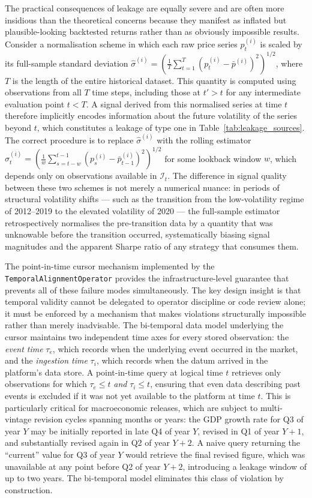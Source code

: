 \documentclass[12pt,openany]{book}
\numberwithin{equation}{chapter}
\theoremstyle{plain}
\theoremstyle{definition}
\theoremstyle{remark}
\begin{document}
The practical consequences of leakage are equally severe and are often more insidious than the theoretical concerns because they manifest as inflated but plausible-looking backtested returns rather than as obviously impossible results. Consider a normalisation scheme in which each raw price series $p_t^{(i)}$ is scaled by its full-sample standard deviation $\hat{\sigma}^{(i)} = \left(\frac{1}{T}\sum_{t=1}^T (p_t^{(i)} - \bar{p}^{(i)})^2\right)^{1/2}$, where $T$ is the length of the entire historical dataset. This quantity is computed using observations from all $T$ time steps, including those at $t' > t$ for any intermediate evaluation point $t < T$. A signal derived from this normalised series at time $t$ therefore implicitly encodes information about the future volatility of the series beyond $t$, which constitutes a leakage of type one in Table~\ref{tab:leakage_sources}. The correct procedure is to replace $\hat{\sigma}^{(i)}$ with the rolling estimator $\hat{\sigma}_t^{(i)} = \left(\frac{1}{w}\sum_{s=t-w}^{t-1} (p_s^{(i)} - \bar{p}_{t-1}^{(i)})^2\right)^{1/2}$ for some lookback window $w$, which depends only on observations available in $\mathcal{I}_t$. The difference in signal quality between these two schemes is not merely a numerical nuance: in periods of structural volatility shifts — such as the transition from the low-volatility regime of 2012–2019 to the elevated volatility of 2020 — the full-sample estimator retrospectively normalises the pre-transition data by a quantity that was unknowable before the transition occurred, systematically biasing signal magnitudes and the apparent Sharpe ratio of any strategy that consumes them.

The point-in-time cursor mechanism implemented by the \texttt{TemporalAlignmentOperator} provides the infrastructure-level guarantee that prevents all of these failure modes simultaneously. The key design insight is that temporal validity cannot be delegated to operator discipline or code review alone; it must be enforced by a mechanism that makes violations structurally impossible rather than merely inadvisable. The bi-temporal data model underlying the cursor maintains two independent time axes for every stored observation: the \emph{event time} $\tau_e$, which records when the underlying event occurred in the market, and the \emph{ingestion time} $\tau_i$, which records when the datum arrived in the platform's data store. A point-in-time query at logical time $t$ retrieves only observations for which $\tau_e \leq t$ \emph{and} $\tau_i \leq t$, ensuring that even data describing past events is excluded if it was not yet available to the platform at time $t$. This is particularly critical for macroeconomic releases, which are subject to multi-vintage revision cycles spanning months or years: the GDP growth rate for Q3 of year $Y$ may be initially reported in late Q4 of year $Y$, revised in Q1 of year $Y+1$, and substantially revised again in Q2 of year $Y+2$. A naive query returning the ``current'' value for Q3 of year $Y$ would retrieve the final revised figure, which was unavailable at any point before Q2 of year $Y+2$, introducing a leakage window of up to two years. The bi-temporal model eliminates this class of violation by construction.
\end{document}
